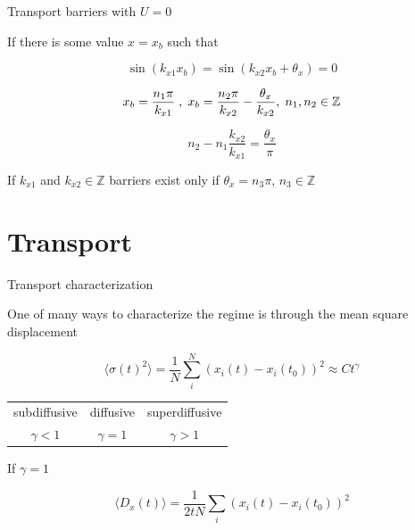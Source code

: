 \documentclass[10pt]{beamer}
\begin{document}
\begin{frame}{Transport barriers with $U = 0$}

If there is some value $x = x_b$ such that

\begin{equation}
\sin(k_{x1}x_b) = \sin(k_{x2}x_b + \theta_x) = 0
\end{equation}

\begin{equation}
    x_b = \frac{n_1\pi}{k_{x1}} \hspace{0.1cm},\hspace{0.1cm} x_b = \frac{n_2\pi}{k_{x2}} - \frac{\theta_x}{k_{x2}}, \hspace{0.1cm} n_1,n_2 \in \mathbb{Z}
\end{equation}


\begin{equation}
    n_2 - n_1\frac{k_{x2}}{k_{x1}} = \frac{\theta_x}{\pi}    
\end{equation}

If $k_{x1}$ and $k_{x2} \in \mathbb{Z}$ barriers exist only if $\theta_x = n_3\pi$, $n_3 \in \mathbb{Z}$

\end{frame}

\section{Transport}


\begin{frame}{Transport characterization}

One of many ways to characterize the regime is through the mean square displacement

\begin{equation}
\langle \sigma(t)^2 \rangle = \frac{1}{N}\sum_i^N (x_i(t) - x_i(t_0))^2 \approx Ct^\gamma 
\label{eq_sigmaquad}
\end{equation}

\begin{table}
    \begin{tabular}{c|c|c}
        subdiffusive & diffusive & superdiffusive\\
        $\gamma < 1$ & $\gamma = 1$ & $\gamma > 1$  
    \end{tabular}
\end{table}

If $\gamma = 1$

\begin{equation}
\langle D_x(t) \rangle = \frac{1}{2tN}\sum_i (x_i(t) - x_i(t_0))^2 
\label{eq_dif}
\end{equation}


\end{frame}
\end{document}
